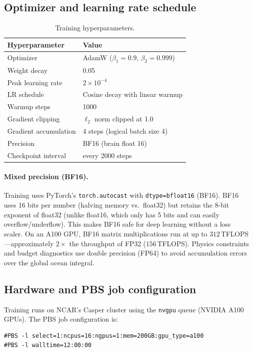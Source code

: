 \documentclass[11pt]{article}
\begin{document}
\subsection{Optimizer and learning rate schedule}
\begin{table}[h]
\centering
\caption{Training hyperparameters.}
\label{tab:trainhp}
\begin{tabular}{ll}
\toprule
Hyperparameter & Value \\
\midrule
Optimizer & AdamW ($\beta_1=0.9$, $\beta_2=0.999$) \\
Weight decay & 0.05 \\
Peak learning rate & $2\times10^{-4}$ \\
LR schedule & Cosine decay with linear warmup \\
Warmup steps & 1000 \\
Gradient clipping & $\ell_2$ norm clipped at 1.0 \\
Gradient accumulation & 4 steps (logical batch size 4) \\
Precision & BF16 (brain float 16) \\
Checkpoint interval & every 2000 steps \\
\bottomrule
\end{tabular}
\end{table}

\paragraph{Mixed precision (BF16).}
Training uses PyTorch's \texttt{torch.autocast} with \texttt{dtype=bfloat16}
(BF16). BF16 uses 16 bits per number (halving memory vs.\ float32) but retains
the 8-bit exponent of float32 (unlike float16, which only has 5 bits and
can easily overflow/underflow). This makes BF16 safe for deep learning without
a loss scaler. On an A100 GPU, BF16 matrix multiplications run at up to
$312$\,TFLOPS---approximately $2\times$ the throughput of FP32
($156$\,TFLOPS). Physics constraints and budget diagnostics use double precision
(FP64) to avoid accumulation errors over the global ocean integral.

\subsection{Hardware and PBS job configuration}
\label{sec:hardware}
Training runs on NCAR's Casper cluster using the \texttt{nvgpu} queue
(NVIDIA A100 GPUs). The PBS job configuration is:
\begin{lstlisting}
#PBS -l select=1:ncpus=16:ngpus=1:mem=200GB:gpu_type=a100
#PBS -l walltime=12:00:00
\end{lstlisting}
\end{document}
